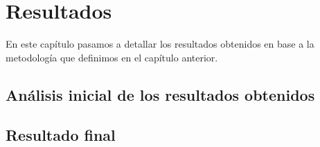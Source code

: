 \chapter{Resultados}

En este capítulo pasamos a detallar los resultados obtenidos en base a la metodología que definimos en el capítulo anterior.

\section{Análisis inicial de los resultados obtenidos}

\blindtext

\section{Resultado final}

\blindtext


